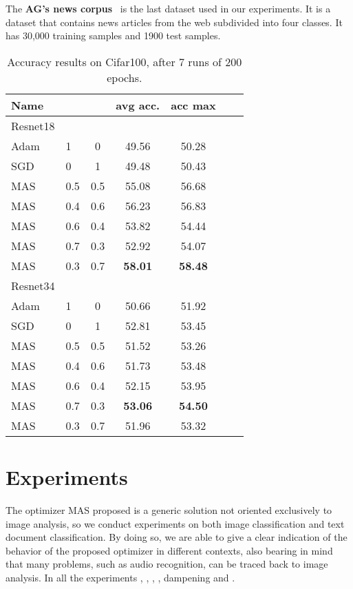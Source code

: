 \documentclass[10pt,twocolumn,letterpaper]{article}
\begin{document}
The \textbf{AG’s news corpus}~\cite{agnews,zhang2015character} is the last dataset used in our experiments. It is a dataset that contains news articles from the web subdivided into four classes. It has 30,000 training samples and 1900 test samples.


\begin{table}
    \caption{Accuracy results on Cifar100, after 7 runs of 200 epochs.}
    \label{tab:accuracyCifar100}
    \begin{center}
        \begin{tabular}{llccccc} 
            \hline
            Name &  &  & avg acc. & acc max\\
            \hline
            Resnet18 &  & & \\
            \hline
            Adam & 1 & 0 & 49.56 & 50.28 \\
            SGD & 0 & 1 & 49.48 & 50.43 \\
            MAS & 0.5 & 0.5 & 55.08 & 56.68 \\
            MAS & 0.4 & 0.6 & 56.23 & 56.83 \\
            MAS & 0.6 & 0.4 & 53.82 & 54.44 \\
            MAS & 0.7 & 0.3 & 52.92 & 54.07 \\
            MAS & 0.3 & 0.7 & \textbf{58.01} & \textbf{58.48} \\
            \hline
            Resnet34 & & & \\
            \hline
            Adam & 1 & 0 & 50.66 & 51.92 \\
            SGD & 0 & 1 & 52.81 & 53.45 \\
            MAS & 0.5 & 0.5 & 51.52 & 53.26 \\
            MAS & 0.4 & 0.6 & 51.73 & 53.48 \\
            MAS & 0.6 & 0.4 & 52.15 & 53.95 \\
            MAS & 0.7 & 0.3 & \textbf{53.06} & \textbf{54.50} \\
            MAS & 0.3 & 0.7 & 51.96 & 53.32 \\
            \hline
        \end{tabular}
    \end{center}
\end{table}

\section{Experiments}
The optimizer MAS proposed is a generic solution not oriented exclusively to image analysis, so we conduct experiments on both image classification and text document classification.
By doing so, we are able to give a clear indication of the behavior of the proposed optimizer in different contexts, also bearing in mind that many problems, such as audio recognition, can be traced back to image analysis.
In all the experiments , , , , dampening  and .
\end{document}

